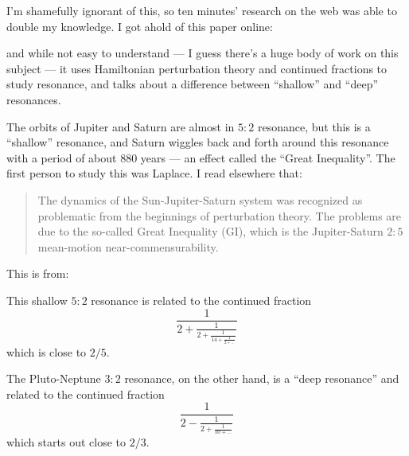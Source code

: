 \documentclass{article}
\def\tightlist{}
\renewcommand{\texttt}[1]{%
  \begingroup
  \ttfamily
  \begingroup\lccode`~=`/\lowercase{\endgroup\def~}{/\discretionary{}{}{}}%
  \begingroup\lccode`~=`[\lowercase{\endgroup\def~}{[\discretionary{}{}{}}%
  \begingroup\lccode`~=`.\lowercase{\endgroup\def~}{.\discretionary{}{}{}}%
  \catcode`/=\active\catcode`[=\active\catcode`.=\active
  \scantokens{#1\noexpand}%
  \endgroup
}
\begin{document}
I'm shamefully ignorant of this, so ten minutes' research on the web was
able to double my knowledge. I got ahold of this paper online:


and while not easy to understand --- I guess there's a huge body of work
on this subject --- it uses Hamiltonian perturbation theory and
continued fractions to study resonance, and talks about a difference
between ``shallow'' and ``deep'' resonances.

The orbits of Jupiter and Saturn are almost in \(5:2\) resonance, but
this is a ``shallow'' resonance, and Saturn wiggles back and forth
around this resonance with a period of about 880 years --- an effect
called the ``Great Inequality''. The first person to study this was
Laplace. I read elsewhere that:

\begin{quote}
The dynamics of the Sun-Jupiter-Saturn system was recognized as
problematic from the beginnings of perturbation theory. The problems are
due to the so-called Great Inequality (GI), which is the Jupiter-Saturn
\(2:5\) mean-motion near-commensurability.
\end{quote}

This is from:


This shallow \(5:2\) resonance is related to the continued fraction
\[\frac{1}{2+\frac{1}{2+\frac{1}{14+\frac{1}{2+\ldots}}}}\] which is
close to \(2/5\).

The Pluto-Neptune \(3:2\) resonance, on the other hand, is a ``deep
resonance'' and related to the continued fraction
\[\frac{1}{2-\frac{1}{2+\frac{1}{10+\ldots}}}\] which starts out close
to \(2/3\).
\end{document}

